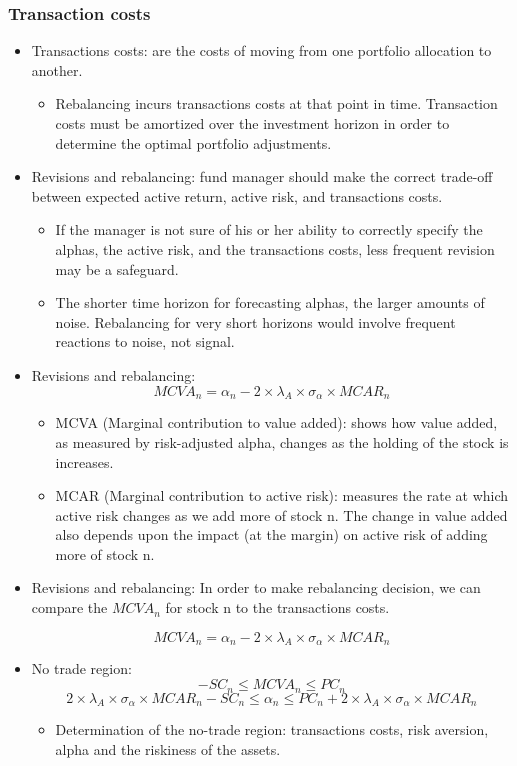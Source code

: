 \subsubsection{Transaction costs}
\begin{itemize}
\item Transactions costs: are the costs of moving from one portfolio allocation to another.
    \begin{itemize}
    \item Rebalancing incurs transactions costs at that point in time. Transaction costs must be amortized over the investment horizon in order to determine the optimal portfolio adjustments.
    \end{itemize}
    
\item Revisions and rebalancing: fund manager should make the correct trade-off between expected active return, active risk, and transactions costs.
    \begin{itemize}
    \item If the manager is not sure of his or her ability to correctly specify the alphas, the active risk, and the transactions costs, less frequent revision may be a safeguard.
    \item The shorter time horizon for forecasting alphas, the larger amounts of noise. Rebalancing for very short horizons would involve frequent reactions to noise, not signal.
    \end{itemize}
\item Revisions and rebalancing:
\[
MCVA_n = \alpha_n - 2 \times \lambda_A \times \sigma_{\alpha} \times MCAR_n
\]
    \begin{itemize}
    \item MCVA (Marginal contribution to value added): shows how value added, as measured by risk-adjusted alpha, changes as the holding of the stock is increases.
    \item MCAR (Marginal contribution to active risk): measures the rate at which active risk changes as we add more of stock n. The change in value added also depends upon the impact (at the margin) on active risk of adding more of stock n.
    \end{itemize}
\item Revisions and rebalancing: In order to make rebalancing decision, we can compare the $MCVA_n$ for stock n to the transactions costs.

\[
MCVA_n = \alpha_n - 2 \times \lambda_A \times \sigma_{\alpha} \times MCAR_n
\]
\item No trade region:
\[
 - SC_n \leq MCVA_n \leq PC_n
\]
\[
2 \times \lambda_A \times \sigma_{\alpha} \times MCAR_n - SC_n \leq \alpha_n \leq PC_n + 2 \times \lambda_A \times \sigma_{\alpha} \times MCAR_n
\]
    \begin{itemize}
    \item Determination of the no-trade region: transactions costs, risk aversion, alpha and the riskiness of the assets.
    \end{itemize}
\end{itemize}
